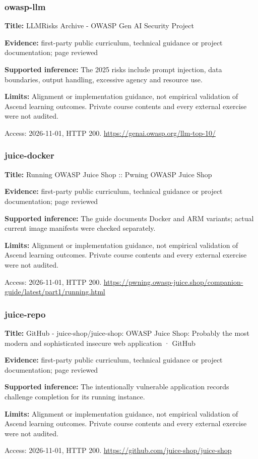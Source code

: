 \subsubsection{owasp-llm}
\noindent\textbf{Title:} LLMRisks Archive - OWASP Gen AI Security Project\par
\noindent\textbf{Evidence:} first-party public curriculum, technical guidance or project documentation; page reviewed\par
\noindent\textbf{Supported inference:} The 2025 risks include prompt injection, data boundaries, output handling, excessive agency and resource use.\par
\noindent\textbf{Limits:} Alignment or implementation guidance, not empirical validation of Ascend learning outcomes. Private course contents and every external exercise were not audited.\par
\noindent Access: 2026-11-01, HTTP 200. \url{https://genai.owasp.org/llm-top-10/}
\subsubsection{juice-docker}
\noindent\textbf{Title:} Running OWASP Juice Shop :: Pwning OWASP Juice Shop\par
\noindent\textbf{Evidence:} first-party public curriculum, technical guidance or project documentation; page reviewed\par
\noindent\textbf{Supported inference:} The guide documents Docker and ARM variants; actual current image manifests were checked separately.\par
\noindent\textbf{Limits:} Alignment or implementation guidance, not empirical validation of Ascend learning outcomes. Private course contents and every external exercise were not audited.\par
\noindent Access: 2026-11-01, HTTP 200. \url{https://pwning.owasp-juice.shop/companion-guide/latest/part1/running.html}
\subsubsection{juice-repo}
\noindent\textbf{Title:} GitHub - juice-shop/juice-shop: OWASP Juice Shop: Probably the most modern and sophisticated insecure web application · GitHub\par
\noindent\textbf{Evidence:} first-party public curriculum, technical guidance or project documentation; page reviewed\par
\noindent\textbf{Supported inference:} The intentionally vulnerable application records challenge completion for its running instance.\par
\noindent\textbf{Limits:} Alignment or implementation guidance, not empirical validation of Ascend learning outcomes. Private course contents and every external exercise were not audited.\par
\noindent Access: 2026-11-01, HTTP 200. \url{https://github.com/juice-shop/juice-shop}
